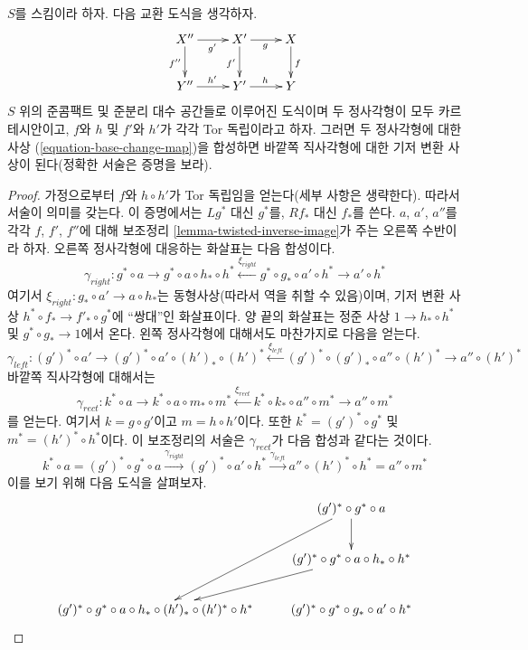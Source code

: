 \begin{lemma}
\label{lemma-compose-base-change-maps-horizontal}
$S$를 스킴이라 하자. 다음 교환 도식을 생각하자.
$$
\xymatrix{
X'' \ar[r]_{g'} \ar[d]_{f''} & X' \ar[r]_g \ar[d]_{f'} & X \ar[d]^f \\
Y'' \ar[r]^{h'} & Y' \ar[r]^h & Y
}
$$
$S$ 위의 준콤팩트 및 준분리 대수 공간들로 이루어진 도식이며 두
정사각형이 모두 카르테시안이고, $f$와 $h$ 및 $f'$와 $h'$가 각각
Tor 독립이라고 하자. 그러면 두 정사각형에 대한 사상
(\ref{equation-base-change-map})을 합성하면 바깥쪽 직사각형에 대한
기저 변환 사상이 된다(정확한 서술은 증명을 보라).
\end{lemma}

\begin{proof}
가정으로부터 $f$와 $h \circ h'$가 Tor 독립임을 얻는다(세부 사항은
생략한다). 따라서 서술이 의미를 갖는다. 이 증명에서는 $Lg^*$ 대신
$g^*$를, $Rf_*$ 대신 $f_*$를 쓴다. $a$, $a'$, $a''$를 각각 $f$,
$f'$, $f''$에 대해 보조정리 \ref{lemma-twisted-inverse-image}가 주는
오른쪽 수반이라 하자. 오른쪽 정사각형에 대응하는 화살표는 다음
합성이다.
$$
\gamma_{right} :
g^* \circ a \to g^* \circ a \circ h_* \circ h^*
\xleftarrow{\xi_{right}} g^* \circ g_* \circ a' \circ h^* \to a' \circ h^*
$$
여기서 $\xi_{right} : g_* \circ a' \to a \circ h_*$는 동형사상(따라서
역을 취할 수 있음)이며, 기저 변환 사상
$h^* \circ f_* \to f'_* \circ g^*$에 “쌍대”인 화살표이다.
양 끝의 화살표는 정준 사상 $1 \to h_* \circ h^*$ 및
$g^* \circ g_* \to 1$에서 온다. 왼쪽 정사각형에 대해서도 마찬가지로
다음을 얻는다.
$$
\gamma_{left} :
(g')^* \circ a' \to (g')^* \circ a' \circ (h')_* \circ (h')^*
\xleftarrow{\xi_{left}}
(g')^* \circ (g')_* \circ a'' \circ (h')^* \to a'' \circ (h')^*
$$
바깥쪽 직사각형에 대해서는
$$
\gamma_{rect} :
k^* \circ a \to
k^* \circ a \circ m_* \circ m^* \xleftarrow{\xi_{rect}}
k^* \circ k_* \circ a'' \circ m^* \to
a'' \circ m^*
$$
를 얻는다. 여기서 $k = g \circ g'$이고 $m = h \circ h'$이다.
또한 $k^* = (g')^* \circ g^*$ 및
$m^* = (h')^* \circ h^*$이다. 이 보조정리의 서술은
$\gamma_{rect}$가 다음 합성과 같다는 것이다.
$$
k^* \circ a =
(g')^* \circ g^* \circ a \xrightarrow{\gamma_{right}}
(g')^* \circ a' \circ h^* \xrightarrow{\gamma_{left}}
a'' \circ (h')^* \circ h^* = a'' \circ m^*
$$
이를 보기 위해 다음 도식을 살펴보자.
$$
\xymatrix{
& (g')^* \circ g^* \circ a \ar[d] \ar[ddl] \\
& (g')^* \circ g^* \circ a \circ h_* \circ h^* \ar[ld] \\
(g')^* \circ g^* \circ a \circ h_* \circ (h')_* \circ (h')^* \circ h^* &
(g')^* \circ g^* \circ g_* \circ a' \circ h^*
}$$
\end{proof}
